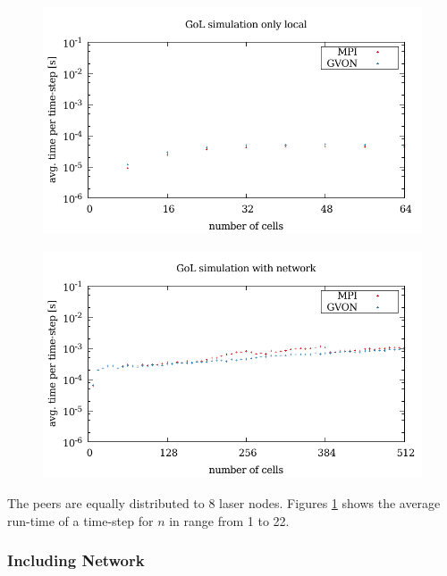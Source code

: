\begin{figure}[H]
  \begin{minipage}[t]{0.5\textwidth}
    \includegraphics[width=\textwidth]{plots/50_gol_ncells_laser}
    \label{fig:gol_laser}
    \caption{ }
  \end{minipage}%
  \begin{minipage}[t]{0.5\textwidth}
    \includegraphics[width=\textwidth]{plots/50_gol_network_laser}
    \label{fig:gol_network_laser}
    \caption{ }
  \end{minipage}%
\end{figure}

The peers are equally distributed to 8 laser nodes. Figures
\ref{fig:gol_network_laser} shows the average run-time of a time-step
for $n$ in range from 1 to 22.

\subsubsection*{Including Network}

